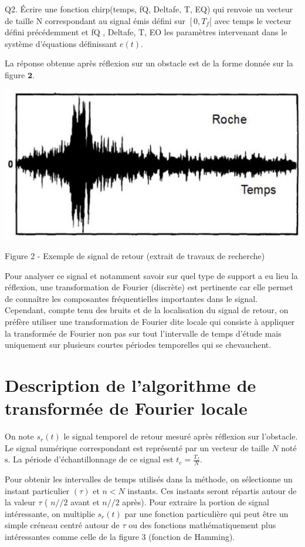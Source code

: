 \documentclass[10pt]{article}
\begin{document}
Q2. Écrire une fonction chirp(temps, fQ, Deltafe, T, EQ) qui renvoie un vecteur de taille $\mathrm{N}$ correspondant au signal émis défini sur $\left[0, T_{f}[\right.$ avec temps le vecteur défini précédemment et fQ , Deltafe, T, EO les paramètres intervenant dans le système d'équations définissant $e(t)$.

La réponse obtenue après réflexion sur un obstacle est de la forme donnée sur la figure $\mathbf{2}$.

\includegraphics[max width=\textwidth]{2022_02_02_1af495ea60fb42b668bfg-03(1)}

Figure 2 - Exemple de signal de retour (extrait de travaux de recherche)

Pour analyser ce signal et notamment savoir sur quel type de support a eu lieu la réflexion, une transformation de Fourier (discrète) est pertinente car elle permet de connaître les composantes fréquentielles importantes dans le signal. Cependant, compte tenu des bruits et de la localisation du signal de retour, on préfère utiliser une transformation de Fourier dite locale qui consiste à appliquer la transformée de Fourier non pas sur tout l'intervalle de temps d'étude mais uniquement sur plusieurs courtes périodes temporelles qui se chevauchent.

\section{Description de l'algorithme de transformée de Fourier locale}
On note $s_{r}(t)$ le signal temporel de retour mesuré après réflexion sur l'obstacle. Le signal numérique correspondant est représenté par un vecteur de taille $N$ noté $\mathrm{s}$. La période d'échantillonnage de ce signal est $t_{e}=\frac{T_{f}}{N}$.

Pour obtenir les intervalles de temps utilisés dans la méthode, on sélectionne un instant particulier $(\tau)$ et $n<N$ instants. Ces instants seront répartis autour de la valeur $\tau$ ( $n / / 2$ avant et $n / / 2$ après). Pour extraire la portion de signal intéressante, on multiplie $s_{r}(t)$ par une fonction particulière qui peut être un simple créneau centré autour de $\tau$ ou des fonctions mathématiquement plus intéressantes comme celle de la figure 3 (fonction de Hamming).
\end{document}

